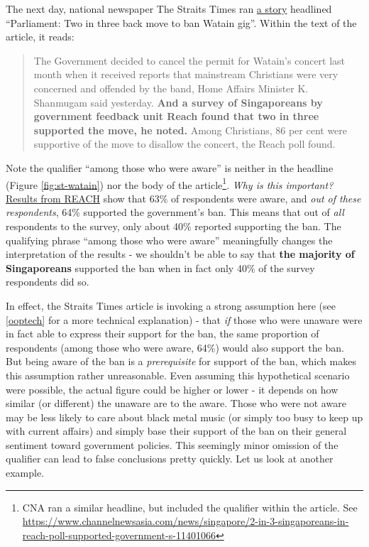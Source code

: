 \documentclass[
  openany]{book}
\begin{document}
The next day, national newspaper The Straits Times ran \href{https://www.straitstimes.com/politics/singapolitics/parliament-two-out-of-three-singaporeans-back-governments-move-to-cancel}{a story} headlined ``Parliament: Two in three back move to ban Watain gig''. Within the text of the article, it reads:

\begin{quote}
The Government decided to cancel the permit for Watain's concert last month when it received reports that mainstream Christians were very concerned and offended by the band, Home Affairs Minister K. Shanmugam said yesterday. \textbf{And a survey of Singaporeans by government feedback unit Reach found that two in three supported the move, he noted.} Among Christians, 86 per cent were supportive of the move to disallow the concert, the Reach poll found.
\end{quote}

Note the qualifier ``among those who were aware'' is neither in the headline (Figure \ref{fig:st-watain}) nor the body of the article\footnote{CNA ran a similar headline, but included the qualifier within the article. See \url{https://www.channelnewsasia.com/news/singapore/2-in-3-singaporeans-in-reach-poll-supported-government-s-11401066}}. \emph{Why is this important?} \href{https://www.reach.gov.sg/~/media/2019/press-release/findings-of-poll-on-watain-concert--1-april-2019.pdf}{Results from REACH} show that 63\% of respondents were aware, and \emph{out of these respondents}, 64\% supported the government's ban. This means that out of \emph{all} respondents to the survey, only about 40\% reported supporting the ban. The qualifying phrase ``among those who were aware'' meaningfully changes the interpretation of the results - we shouldn't be able to say that \textbf{the majority of Singaporeans} supported the ban when in fact only 40\% of the survey respondents did so.

In effect, the Straits Times article is invoking a strong assumption here (see \ref{ooptech} for a more technical explanation) - that \emph{if} those who were unaware were in fact able to express their support for the ban, the same proportion of respondents (among those who were aware, 64\%) would also support the ban. But being aware of the ban is a \emph{prerequisite} for support of the ban, which makes this assumption rather unreasonable. Even assuming this hypothetical scenario were possible, the actual figure could be higher or lower - it depends on how similar (or different) the unaware are to the aware. Those who were not aware may be less likely to care about black metal music (or simply too busy to keep up with current affairs) and simply base their support of the ban on their general sentiment toward government policies. This seemingly minor omission of the qualifier can lead to false conclusions pretty quickly. Let us look at another example.
\end{document}
